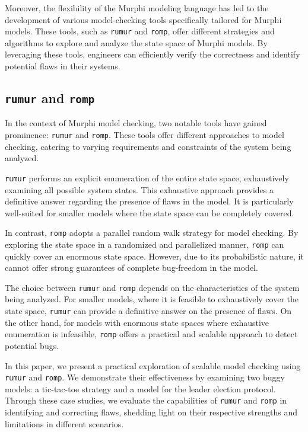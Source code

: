 Moreover, the flexibility of the Murphi modeling language has led to the
development of various model-checking tools specifically tailored for Murphi
models.
These tools, such as \texttt{rumur} and \texttt{romp}, offer different
strategies and algorithms to explore and analyze the state space of Murphi
models.
By leveraging these tools, engineers can efficiently verify the correctness
and identify potential flaws in their systems.

\subsection{\texttt{rumur} and \texttt{romp}}\label{subsec:rumur-and-romp}

In the context of Murphi model checking, two notable tools have gained
prominence: \texttt{rumur} and \texttt{romp}.
These tools offer different approaches to model checking,
catering to varying requirements and constraints of the system being analyzed.

\texttt{rumur} performs an explicit enumeration of the entire state space,
exhaustively examining all possible system states.
This exhaustive approach provides a definitive answer regarding the presence of
flaws in the model.
It is particularly well-suited for smaller models where the state space can be
completely covered.

In contrast, \texttt{romp} adopts a parallel random walk strategy for model
checking.
By exploring the state space in a randomized and parallelized manner,
\texttt{romp} can quickly cover an enormous state space.
However, due to its probabilistic nature, it cannot offer strong guarantees of
complete bug-freedom in the model.

The choice between \texttt{rumur} and \texttt{romp} depends on the
characteristics of the system being analyzed.
For smaller models, where it is feasible to exhaustively cover the state space,
\texttt{rumur} can provide a definitive answer on the presence of flaws.
On the other hand, for models with enormous state spaces where exhaustive
enumeration is infeasible, \texttt{romp} offers a practical and scalable
approach to detect potential bugs.

In this paper, we present a practical exploration of scalable model checking
using \texttt{rumur} and \texttt{romp}.
We demonstrate their effectiveness by examining two buggy models:
a tic-tac-toe strategy and a model for the leader election protocol.
Through these case studies, we evaluate the capabilities of
\texttt{rumur} and \texttt{romp} in identifying and correcting flaws,
shedding light on their respective strengths and limitations in different
scenarios.
